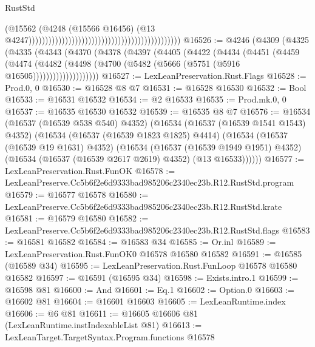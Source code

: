 \begin{lexlean}{RustStd}
\begin{coremodule}
                                                                                          (@15562
                                                                                            (@4248
                                                                                              (@15566
                                                                                                @16456)
                                                                                              (@13
                                                                                                @4247))))))))))))))))))))))))))))))))))))))))))))))
@16526 := @4246
    (@4309
      (@4325
        (@4335
          (@4343
            (@4370
              (@4378
                (@4397
                  (@4405
                    (@4422
                      (@4434
                        (@4451
                          (@4459
                            (@4474
                              (@4482
                                (@4498 (@4700 (@5482 (@5666 (@5751 (@5916 @16505))))))))))))))))))))
@16527 := LexLeanPreservation.Rust.Flags
@16528 := Prod.{0, 0}
@16530 := @16528 @8 @7
@16531 := @16528 @16530
@16532 := Bool
@16533 := @16531 @16532
@16534 := @2 @16533
@16535 := Prod.mk.{0, 0}
@16537 := @16535 @16530 @16532
@16539 := @16535 @8 @7
@16576 := @16534
    (@16537 (@16539 @538 @540) @4352)
    (@16534
      (@16537 (@16539 @1541 @1543) @4352)
      (@16534
        (@16537 (@16539 @1823 @1825) @4414)
        (@16534
          (@16537 (@16539 @19 @1631) @4352)
          (@16534
            (@16537 (@16539 @1949 @1951) @4352)
            (@16534 (@16537 (@16539 @2617 @2619) @4352) (@13 @16533))))))
@16577 := LexLeanPreservation.Rust.FunOK
@16578 := LexLeanPreserve.Cc5b6f2e6d9333bad985206c2340ec23b.R12.RustStd.program
@16579 := @16577 @16578
@16580 := LexLeanPreserve.Cc5b6f2e6d9333bad985206c2340ec23b.R12.RustStd.krate
@16581 := @16579 @16580
@16582 := LexLeanPreserve.Cc5b6f2e6d9333bad985206c2340ec23b.R12.RustStd.flags
@16583 := @16581 @16582
@16584 := @16583 @34
@16585 := Or.inl
@16589 := LexLeanPreservation.Rust.FunOK0 @16578 @16580 @16582
@16591 := @16585 (@16589 @34)
@16595 := LexLeanPreservation.Rust.FunLoop @16578 @16580 @16582
@16597 := @16591 (@16595 @34)
@16598 := Exists.intro.{1}
@16599 := @16598 @81
@16600 := And
@16601 := Eq.{1}
@16602 := Option.{0}
@16603 := @16602 @81
@16604 := @16601 @16603
@16605 := LexLeanRuntime.index
@16606 := @6 @81
@16611 := @16605 @16606 @81 (LexLeanRuntime.instIndexableList @81)
@16613 := LexLeanTarget.TargetSyntax.Program.functions @16578

\end{coremodule}
\end{lexlean}
